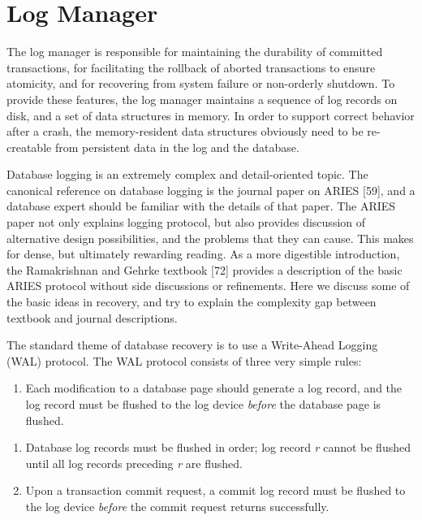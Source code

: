 \documentclass[b5paper,11pt,twoside,openright]{book}
\begin{document}
\hypertarget{log-manager}{%
\section{Log Manager}\label{log-manager}}

The log manager is responsible for maintaining the durability of
committed transactions, for facilitating the rollback of aborted
transactions to ensure atomicity, and for recovering from system failure
or non-orderly shutdown. To provide these features, the log manager
maintains a sequence of log records on disk, and a set of data
structures in memory. In order to support correct behavior after a
crash, the memory-resident data structures obviously need to be
re-creatable from persistent data in the log and the database.

Database logging is an extremely complex and detail-oriented topic. The
canonical reference on database logging is the journal paper on ARIES
{[}59{]}, and a database expert should be familiar with the details of
that paper. The ARIES paper not only explains logging protocol, but also
provides discussion of alternative design possibilities, and the
problems that they can cause. This makes for dense, but ultimately
rewarding reading. As a more digestible introduction, the Ramakrishnan
and Gehrke textbook {[}72{]} provides a description of the basic ARIES
protocol without side discussions or refinements. Here we discuss some
of the basic ideas in recovery, and try to explain the complexity gap
between textbook and journal descriptions.

The standard theme of database recovery is to use a Write-Ahead Logging
(WAL) protocol. The WAL protocol consists of three very simple rules:

\begin{enumerate}
\def\labelenumi{\arabic{enumi}.}

\item
  Each modification to a database page should generate a log record, and
  the log record must be flushed to the log device \emph{before} the
  database page is flushed.
\end{enumerate}

\begin{enumerate}
\def\labelenumi{\arabic{enumi}.}
\setcounter{enumi}{1}
\item
  Database log records must be flushed in order; log record \emph{r}
  cannot be flushed until all log records preceding \emph{r} are
  flushed.
\item
  Upon a transaction commit request, a commit log record must be flushed
  to the log device \emph{before} the commit request returns
  successfully.
\end{enumerate}
\end{document}

